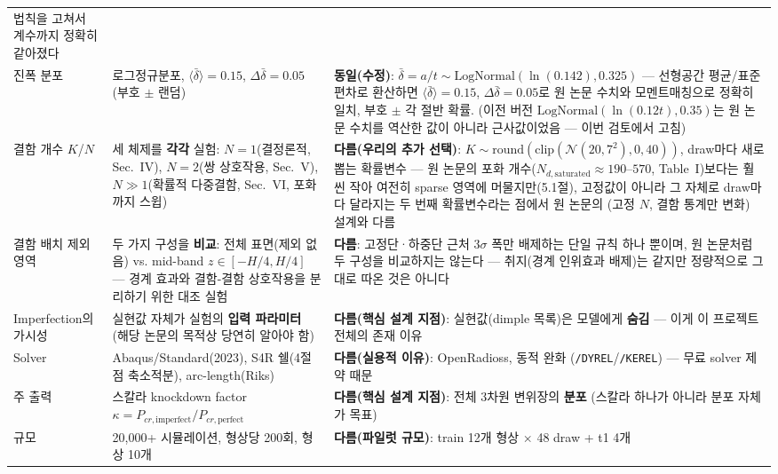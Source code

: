 \documentclass[11pt]{article}
\begin{document}
\begin{longtable}{@{}p{2.6cm}p{5.4cm}p{5.4cm}@{}}
  법칙을 고쳐서 계수까지 정확히 같아졌다 \\
\addlinespace
진폭 분포 &
  로그정규분포, $\langle\bar\delta\rangle{=}0.15$, $\Delta\bar\delta{=}0.05$
  (부호 $\pm$ 랜덤) &
  \textbf{동일(수정)}: $\bar\delta{=}a/t \sim \mathrm{LogNormal}(\ln(0.142),
  0.325)$ --- 선형공간 평균/표준편차로 환산하면 $\langle\bar\delta\rangle{=}0.15$,
  $\Delta\bar\delta{=}0.05$로 원 논문 수치와 모멘트매칭으로 정확히 일치,
  부호 $\pm$ 각 절반 확률. (이전 버전 $\mathrm{LogNormal}(\ln(0.12t),0.35)$는
  원 논문 수치를 역산한 값이 아니라 근사값이었음 --- 이번 검토에서 고침) \\
\addlinespace
결함 개수 $K$/$N$ &
  세 체제를 \textbf{각각} 실험: $N{=}1$(결정론적, Sec.~IV), $N{=}2$(쌍
  상호작용, Sec.~V), $N\gg1$(확률적 다중결함, Sec.~VI, 포화까지 스윕) &
  \textbf{다름(우리의 추가 선택)}: $K \sim
  \mathrm{round}(\mathrm{clip}(\mathcal{N}(20,7^2),0,40))$, draw마다 새로
  뽑는 확률변수 --- 원 논문의 포화 개수($N_{d,\text{saturated}} \approx
  190$--$570$, Table~I)보다는 훨씬 작아 여전히 sparse 영역에 머물지만(5.1절),
  고정값이 아니라 그 자체로 draw마다 달라지는 두 번째 확률변수라는 점에서
  원 논문의 (고정 $N$, 결함 통계만 변화) 설계와 다름 \\
\addlinespace
결함 배치 제외 영역 &
  두 가지 구성을 \textbf{비교}: 전체 표면(제외 없음) vs. mid-band
  $z\in[-H/4,H/4]$ --- 경계 효과와 결함-결함 상호작용을 분리하기 위한 대조
  실험 &
  \textbf{다름}: 고정단·하중단 근처 $3\sigma$ 폭만 배제하는 단일 규칙 하나
  뿐이며, 원 논문처럼 두 구성을 비교하지는 않는다 --- 취지(경계 인위효과
  배제)는 같지만 정량적으로 그대로 따온 것은 아니다 \\
\addlinespace
Imperfection의 가시성 &
  실현값 자체가 실험의 \textbf{입력 파라미터} (해당 논문의 목적상 당연히 알아야 함) &
  \textbf{다름(핵심 설계 지점)}: 실현값(dimple 목록)은 모델에게
  \textbf{숨김} --- 이게 이 프로젝트 전체의 존재 이유 \\
\addlinespace
Solver &
  Abaqus/Standard(2023), S4R 쉘(4절점 축소적분), arc-length(Riks) &
  \textbf{다름(실용적 이유)}: OpenRadioss, 동적 완화
  (\texttt{/DYREL}/\texttt{/KEREL}) --- 무료 solver 제약 때문 \\
\addlinespace
주 출력 &
  스칼라 knockdown factor $\kappa = P_{cr,\text{imperfect}}/P_{cr,\text{perfect}}$ &
  \textbf{다름(핵심 설계 지점)}: 전체 3차원 변위장의 \textbf{분포} (스칼라
  하나가 아니라 분포 자체가 목표) \\
\addlinespace
규모 &
  20,000+ 시뮬레이션, 형상당 200회, 형상 10개 &
  \textbf{다름(파일럿 규모)}: train 12개 형상 $\times$ 48 draw + t1 4개

\end{longtable}
\end{document}
